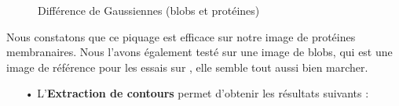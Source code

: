 \begin{figure}[!ht]
\begin{center}
\begin{minipage}{.450\linewidth}
 \end{minipage} \hfill
\caption{Différence de Gaussiennes (blobs et protéines)}
\end{center}
\end{figure}

Nous constatons que ce piquage est efficace sur notre image de protéines membranaires. Nous l'avons également testé sur une image de blobs, qui est une image de référence pour les essais sur \imj , elle semble tout aussi bien marcher. \\

\pagebreak

\begin{itemize}
\item[•] L'\textbf{Extraction de contours} permet d'obtenir les résultats suivants :
\end{itemize}

